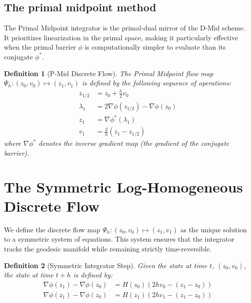 \documentclass[11pt,a4paper]{article}
\newtheorem{definition}{Definition}
\begin{document}
\subsection{The primal midpoint method}

The Primal Midpoint integrator is the primal-dual mirror of the D-Mid scheme. It prioritizes linearization in the primal space, making it particularly effective when the primal barrier $\phi$ is computationally simpler to evaluate than its conjugate $\phi^*$.

\begin{definition}[P-Mid Discrete Flow]
The Primal Midpoint flow map $\Psi_h: (z_0, v_0) \mapsto (z_1, v_1)$ is defined by the following sequence of operations:
\begin{align}
    z_{1/2} &= z_0 + \frac{h}{2}v_0 \label{eq:pmid_halfstep} \\
    \lambda_1 &= 2\nabla \phi(z_{1/2}) - \nabla \phi(z_0) \label{eq:pmid_extrap} \\
    z_1 &= \nabla \phi^*(\lambda_1) \label{eq:pmid_map} \\
    v_1 &= \frac{2}{h}(z_1 - z_{1/2}) \label{eq:pmid_vel}
\end{align}
where $\nabla \phi^*$ denotes the inverse gradient map (the gradient of the conjugate barrier).
\end{definition}


\section{The Symmetric Log-Homogeneous Discrete Flow}

We define the discrete flow map $\Psi_h: (z_0, v_0) \mapsto (z_1, v_1)$ as the unique solution to a symmetric system of equations. This system ensures that the integrator tracks the geodesic manifold while remaining strictly time-reversible.
\begin{definition}[Symmetric Integrator Step]
Given the state at time $t$, $(z_0, v_0)$, the state at time $t+h$ is defined by:
\begin{subequations}
\label{eq:full_integrator}
\begin{align}
    \nabla \phi(z_1) - \nabla \phi(z_0) &= H(z_0)(2hv_0 - (z_1 - z_0)) \label{eq:pos_update} \\
    \nabla \phi(z_1) - \nabla \phi(z_0) &= H(z_1)(2hv_1 - (z_1 - z_0)) \label{eq:vel_update}
\end{align}
\end{subequations}
\end{definition}
\end{document}
